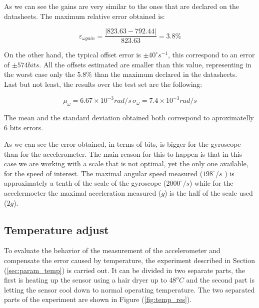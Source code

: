 \documentclass[conference]{IEEEtran}
\newcommand{\refp}[1]{(\ref{#1})}
\begin{document}
As we can see the gains are very similar to the ones that are declared on the datasheets. The maximum relative error obtained is:

\begin{equation}
\varepsilon_{\omega gain} = \frac{|823.63 - 792.44|}{823.63} = 3.8 \%
\end{equation}

On the other hand, the typical offset error is $\pm 40 ^\circ s^{-1}$, this correspond to an error of $\pm 574 bits$. All the offsets estimated are smaller than this value, representing in the worst case only the $5.8 \%$ than the maximum declared in the datasheets. \\

Last but not least, the results over the test set are the following:

\begin{equation}
\mu_\omega = 6.67 \times 10^{-3} rad/s\, \sigma_\omega = 7.4 \times 10^{-3} rad/s
\end{equation}

The mean and the standard deviation obtained both correspond to aproximatelly $6$ bits errors.

As we can see the error obtained, in terms of bits, is bigger for the gyroscope than for the accelerometer. The main reason for this to happen is that in this case we are working with a scale that is not optimal, yet the only one available, for the speed of interest. The maximal angular speed measured ($198 ^{\circ} /s$ ) is approximately a tenth of the scale of the gyroscope ($2000^{\circ} /s$) while for the accelermoeter the maximal acceleration measured ($g$) is the half of the scale used ($2 g$). 

\subsection{Temperature adjust}

To evaluate the behavior of the measurement of the accelerometer and compensate the error caused by temperature, the experiment described in Section \refp{sec:param_temp} is carried out. It can be divided in two separate parts, the first is heating up the sensor using a hair dryer up to $48^oC$ and the second part is letting the sensor cool down to normal operating temperature. The two separated parts of the experiment are shown in Figure \refp{fig:temp_res}.
\end{document}
